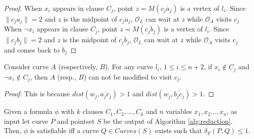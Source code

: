 \documentclass[a4paper,UKenglish]{lipics}
\newcommand{\CS}{{\mathscr S}}
\newcommand{\CO}{{\mathscr O}}
\newcommand{\CQ}{{\mathscr Q}}
\newcommand{\cfev}{{l}} \newcommand{\sq}{{\CS\CQ}}
\newcommand{\distF}{\delta_F}
\newcommand{\Seg}[1]{{\overline{#1}}}
\newcommand{\pset}{S}
\begin{document}
\begin{proof}
When $x_i$ appears in clause $C_j$, point $z = M(\Seg{c_ja_j})$ is 
a vertex of $\cfev_i$. 
Since $\| c_ja_j \| = 2$ and $z$ is the  midpoint of 
 $\Seg{c_ja_j}$,
$\CO_L$ can wait at $z$ while $\CO_A$ visits $c_j$
When $\neg x_i$ appears in clause $C_j$, point $z = M(\Seg{c_jb_j})$ is 
a vertex of $\cfev_i$. 
Since $\| c_jb_j \| = 2$ and $z$ is the  midpoint of 
 $\Seg{c_jb_j}$,
$\CO_L$ can wait at $z$ while $\CO_A$ visits $c_j$
and comes back to $b_j$
\end{proof}



\begin{lemma}\label{lemma:NOTABCanSeeC}
Consider curve $A$ (respectively, $B$).
For any curve $\cfev_i$, $1\le i \le n+2$,
if $ x_i \notin C_j$ and $\neg x_i \notin C_j$,   
then $A$ (resp., $B$) can not be modified to visit $c_j$.
\end{lemma}
\begin{proof}
This is because $dist(w_j,\Seg{a_jc_j}) >1$
and $dist(w_j,\Seg{b_jc_j}) >1$.
\end{proof}









\vspace{0.5 in}

\begin{theorem}
Given a formula $\phi$ with $k$ clauses $C_1, C_2, \dots, C_k$ and $n$ variables $x_1, x_2 \dots, x_n$,
as input let curve $P$ and pointset $\pset$ be the output of Algorithm \ref{alg:reduction}. 
Then, $\phi$ is satisfiable iff a 
curve $Q \in Curves(S)$ exists such that 
$\distF(P,Q) \le 1$.
\end{theorem}
\end{document}
